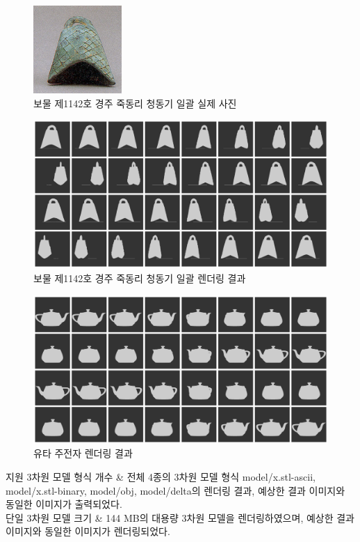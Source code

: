 \documentclass[11pt,oneside,openany,itemph,a4paper,chapter]{oblivoir}
\newenvironment{tablekeyvalue}[2]
{\bgroup
\table[H] \tabularx{\linewidth}{|
>{\setlength{\baselineskip}{1.2\baselineskip}}P{#1\linewidth}|
>{\setlength{\baselineskip}{1.2\baselineskip}}P{#2\linewidth}|}
\hline}
{\endtabularx \endtable \egroup}
\begin{document}
\begin{figure}[h]
\centering
\includegraphics[width=0.3\textwidth]{real.png}
\caption{보물 제1142호 경주 죽동리 청동기 일괄 실제 사진}
\end{figure}

\begin{figure}[h]
\centering
\includegraphics[width=\textwidth]{rendered.png}
\caption{보물 제1142호 경주 죽동리 청동기 일괄 렌더링 결과}
\end{figure}

\begin{figure}[h]
\centering
\includegraphics[width=\textwidth]{teapot.png}
\caption{유타 주전자 렌더링 결과}
\end{figure}

\begin{tablekeyvalue}{0.3}{0.7}
지원 3차원 모델 형식 개수 & 전체 4종의 3차원 모델 형식 model/x.stl-ascii, model/x.stl-binary, model/obj, model/delta의 렌더링 결과, 예상한 결과 이미지와 동일한 이미지가 출력되었다. \\ \hline
단일 3차원 모델 크기 & 144 MB의 대용량 3차원 모델을 렌더링하였으며, 예상한 결과 이미지와 동일한 이미지가 렌더링되었다. \\ \hline
\end{tablekeyvalue}
\end{document}
